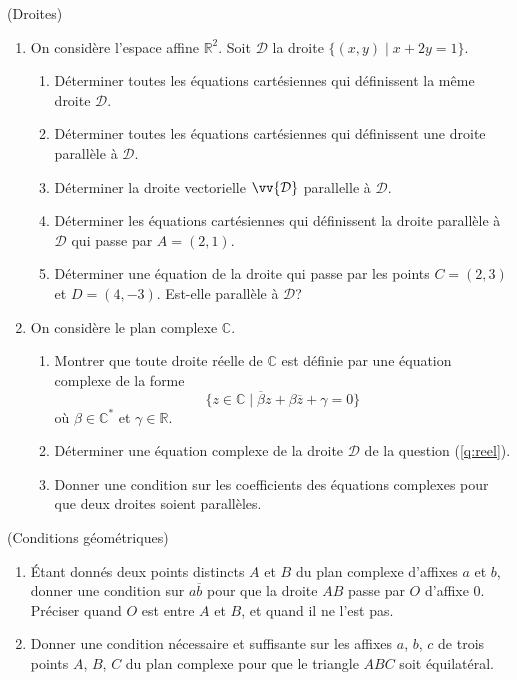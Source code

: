 \documentclass[a4paper,12pt,reqno]{amsart}
\begin{document}

\begin{exo} (Droites)

  \begin{enumerate}
    \item\label{q:reel} On considère l'espace affine $\mathbb{R}^{2}$. Soit $\mathcal{D}$ la droite $\big\{(x,y) \;\big|\; x+2y=1\big\}$.
    \begin{enumerate}
      \item Déterminer toutes les équations cartésiennes qui définissent la même droite $\mathcal{D}$.
      \item Déterminer toutes les équations cartésiennes qui définissent une droite parallèle à $\mathcal{D}$.
      \item Déterminer la droite vectorielle $\vv{\mathcal{D}}$ parallelle à $\mathcal{D}$.
      \item Déterminer les équations cartésiennes qui définissent la droite parallèle à $\mathcal{D}$ qui passe par $A=(2,1)$.
      \item Déterminer une équation de la droite qui passe par les points $C=(2,3)$ et $D=(4,-3)$. Est-elle parallèle à $\mathcal{D}$?
    \end{enumerate}
    \item On considère le plan complexe $\mathbb{C}$.
    \begin{enumerate}
      \item Montrer que toute droite réelle de $\mathbb{C}$ est définie par une équation complexe de la forme
        \[
          \big\{z \in \mathbb{C} \;\big|\; \overline{\beta}z+\beta\overline{z}+\gamma=0\big\}
        \]
        où $\beta \in \mathbb{C}^{*}$ et $\gamma \in \mathbb{R}$.
      \item Déterminer une équation complexe de la droite $\mathcal{D}$ de la question (\ref{q:reel}).
      \item Donner une condition sur les coefficients des équations complexes pour que deux droites soient parallèles.
    \end{enumerate}
  \end{enumerate}
\end{exo}

\begin{exo} (Conditions géométriques)
  \begin{enumerate}
    \item Étant donnés deux points distincts $A$ et $B$ du plan complexe d'affixes $a$ et $b$, donner une condition sur $a\overline{b}$ pour que la droite $AB$ passe par $O$ d'affixe $0$. Préciser quand $O$ est entre $A$ et $B$, et quand il ne l'est pas.

    \item Donner une condition nécessaire et suffisante sur les affixes $a$, $b$, $c$ de trois points $A$, $B$, $C$ du plan complexe pour que le triangle $ABC$ soit équilatéral.
  \end{enumerate}
\end{exo}
\end{document}
